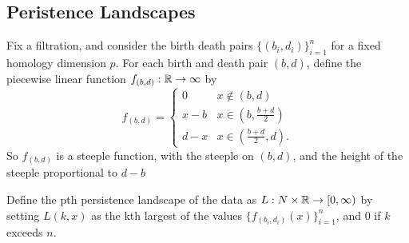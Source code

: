 
\subsection{Peristence Landscapes}

Fix a filtration, and consider the birth death pairs $\{(b_i, d_i)\}_{i=1}^n$ for a fixed homology dimension $p$. For each birth and death pair $(b, d)$, define the piecewise linear function $f_{(b, d)}: \mathbb{R} \rightarrow \infty$ by
$$
f_{(b, d)} = \begin{cases}
                0 & x \not\in (b, d) \\
                x - b & x \in (b, \frac{b + d}{2}) \\
                d - x & x \in (\frac{b + d}{2}, d).
             \end{cases}
$$
So $f_{(b, d)}$ is a steeple function, with the steeple on $(b, d)$, and the height of the steeple proportional to $d - b$

Define the pth persistence landscape of the data as $L: N \times \mathbb{R} \rightarrow [0, \infty)$ by setting $L(k, x)$ as the kth largest of the values $\{f_{(b_i, d_i)}(x)\}_{i=1}^n$, and $0$ if $k$ exceeds $n$.

